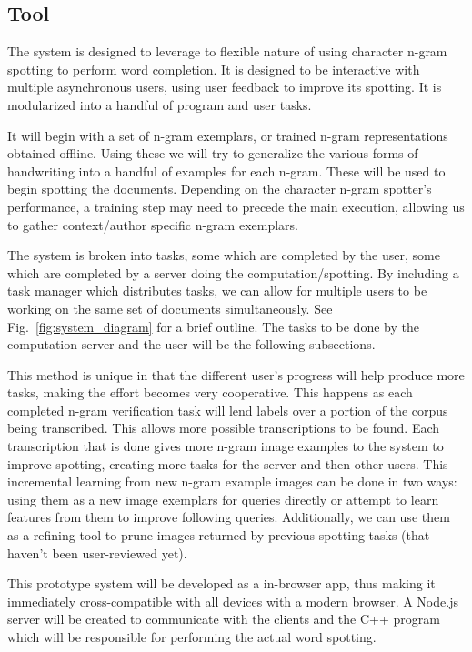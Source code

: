 \documentclass[ms]{byuprop}
\begin{document}
\subsection{Tool}
The system is designed to leverage to flexible nature of using character n-gram spotting to perform word completion. It is designed to be interactive with multiple asynchronous users, using user feedback to improve its spotting. It is modularized into a handful of program and user tasks.

It will begin with a set of n-gram exemplars, or trained n-gram representations obtained offline. Using these we will try to generalize the various forms of handwriting into a handful of examples for each n-gram. These will be used to begin spotting the documents. Depending on the character n-gram spotter's performance, a training step may need to precede the main execution, allowing us to gather context/author specific n-gram exemplars. 

The system is broken into tasks, some which are completed by the user, some which are completed by a server doing the computation/spotting. By including a task manager which distributes tasks, we can allow for multiple users to be working on the same set of documents simultaneously. See Fig.~\ref{fig:system_diagram} for a brief outline. The tasks to be done by the computation server and the user will be the following subsections.

This method is unique in that the different user's progress will help produce more tasks, making the effort becomes very cooperative. This happens as each completed n-gram verification task will lend labels over a portion of the corpus being transcribed. This allows more possible transcriptions to be found. Each transcription that is done gives more n-gram image examples to the system to improve spotting, creating more tasks for the server and then other users. This incremental learning from new n-gram example images can be done in two ways: using them as a new image exemplars for queries directly or attempt to learn features from them to improve following queries. Additionally, we can use them as a refining tool to prune images returned by previous spotting tasks (that haven't been user-reviewed yet).

This prototype system will be developed as a in-browser app, thus making it immediately cross-compatible with all devices with a modern browser. A Node.js server will be created to communicate with the clients and the C++ program which will be responsible for performing the actual word spotting.
\end{document}
